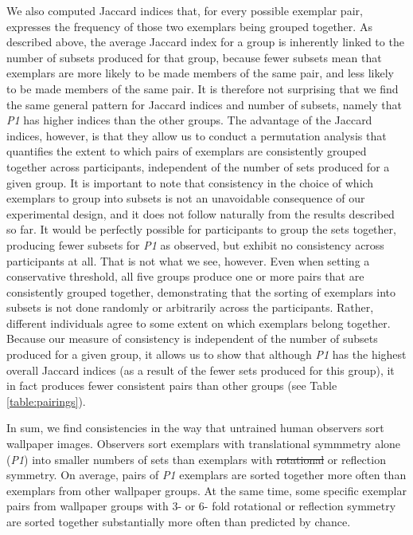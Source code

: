 \documentclass[11pt, twoside]{article}
\providecommand{\DIFaddtex}[1]{{\protect\color{blue}\uwave{#1}}} %
\providecommand{\DIFdeltex}[1]{{\protect\color{red}\sout{#1}}}                      %
\providecommand{\DIFaddbegin}{} %
\providecommand{\DIFaddend}{} %
\providecommand{\DIFdelbegin}{} %
\providecommand{\DIFdelend}{} %
\providecommand{\DIFadd}[1]{\texorpdfstring{\DIFaddtex{#1}}{#1}} %
\providecommand{\DIFdel}[1]{\texorpdfstring{\DIFdeltex{#1}}{}} %
\newcommand{\DIFscaledelfig}{0.5}
\newlength{\DIFdelgraphicswidth} %
\newlength{\DIFdelgraphicsheight} %
\newcommand{\DIFaddincludegraphics}[2][]{{\color{blue}\fbox{\DIFOincludegraphics[#1]{#2}}}} %
\newcommand{\DIFdelincludegraphics}[2][]{%
\sbox{\DIFdelgraphicsbox}{\DIFOincludegraphics[#1]{#2}}%
\settoboxwidth{\DIFdelgraphicswidth}{\DIFdelgraphicsbox} %
\settoboxtotalheight{\DIFdelgraphicsheight}{\DIFdelgraphicsbox} %
\scalebox{\DIFscaledelfig}{%
\parbox[b]{\DIFdelgraphicswidth}{\usebox{\DIFdelgraphicsbox}\\[-\baselineskip] \rule{\DIFdelgraphicswidth}{0em}}\llap{\resizebox{\DIFdelgraphicswidth}{\DIFdelgraphicsheight}{%
\setlength{\unitlength}{\DIFdelgraphicswidth}%
\begin{picture}(1,1)%
\thicklines\linethickness{2pt} %
{\color[rgb]{1,0,0}\put(0,0){\framebox(1,1){}}}%
{\color[rgb]{1,0,0}\put(0,0){\line( 1,1){1}}}%
{\color[rgb]{1,0,0}\put(0,1){\line(1,-1){1}}}%
\end{picture}%
}\hspace*{3pt}}} %
} %
\DeclareRobustCommand{\DIFaddbegin}{\DIFOaddbegin \let\includegraphics\DIFaddincludegraphics} %
\DeclareRobustCommand{\DIFaddend}{\DIFOaddend \let\includegraphics\DIFOincludegraphics} %
\DeclareRobustCommand{\DIFdelbegin}{\DIFOdelbegin \let\includegraphics\DIFdelincludegraphics} %
\DeclareRobustCommand{\DIFdelend}{\DIFOaddend \let\includegraphics\DIFOincludegraphics} %
\begin{document}
\DIFaddend We also computed Jaccard indices that, for every possible exemplar pair, expresses the frequency of those two exemplars being grouped together. As described above, the average Jaccard index for a group is inherently linked to the number of subsets produced for that group, because fewer subsets mean that exemplars are more likely to be made members of the same pair, and less likely to be made members of the same pair. It is therefore not surprising that we find the same general pattern for Jaccard indices and number of subsets, namely that \textit{P1} has higher indices than the other groups. The advantage of the Jaccard indices, however, is that they allow us to conduct a permutation analysis that quantifies the extent to which pairs of exemplars are consistently grouped together across participants, independent of the number of sets produced for a given group. It is important to note that consistency in the choice of which exemplars to group into subsets is not an unavoidable consequence of our experimental design, and it does not follow naturally from the results described so far. It would be perfectly possible for participants to group the sets together, producing fewer subsets for \textit{P1} as observed, but exhibit no consistency across participants at all. That is not what we see, however. Even when setting a conservative threshold, all five groups produce one or more pairs that are consistently grouped together, demonstrating that the sorting of exemplars into subsets is not done randomly or arbitrarily across the participants. Rather, different individuals agree to some extent on which exemplars belong together. Because our measure of consistency is independent of the number of subsets produced for a given group, it allows us to show that although \textit{P1} has the highest overall Jaccard indices (as a result of the fewer sets produced for this group), it in fact produces fewer consistent pairs than other groups (see Table \ref{table:pairings}).

In sum, we find consistencies in the way that untrained human observers sort wallpaper images. Observers sort exemplars with translational symmmetry alone (\textit{P1}) into smaller numbers of sets than exemplars with \DIFdelbegin \DIFdel{rotational }\DIFdelend \DIFaddbegin \DIFadd{rotation }\DIFaddend or reflection symmetry. On average, pairs of \textit{P1} exemplars are sorted together more often than exemplars from other wallpaper groups. At the same time, some specific exemplar pairs from wallpaper groups with 3- or 6- fold rotational or reflection symmetry are sorted together substantially more often than predicted by chance.
\end{document}
